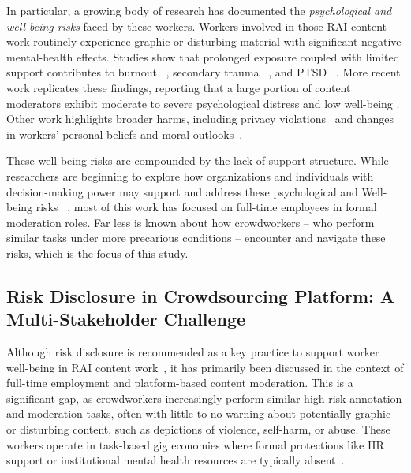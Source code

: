 In particular, a growing body of research has documented the \textit{psychological and well-being risks} faced by these workers. Workers involved in those RAI content work routinely experience graphic or disturbing material with significant negative mental-health effects.  Studies show that prolonged exposure coupled with limited support contributes to burnout ~\cite{dosono2019moderation}, secondary trauma ~\cite{MartinezSadurni2024CaseReport}, and PTSD ~\cite{steiger_psychological_2021, AlEmadi2024HateSpeech, Michel2018ExContentMS, ruckenstein_re-humanizing_2020, Dwoskin_2019, arsht_2018_human}. More recent work replicates these findings, reporting that a large portion of content moderators exhibit moderate to severe psychological distress and low well-being \cite{Spence2025ContentModeratorMentalHealth}. Other work highlights broader harms, including privacy violations~\cite{pinchevski2023social, schopke-gonzalez_why_2022} and changes in workers’ personal beliefs and moral outlooks~\cite{newton_trauma_2019, Stackpole_2022, Douek_2021}.

These well-being risks are compounded by the lack of support structure. While researchers are beginning to explore how organizations and individuals with decision-making power may support and address these psychological and Well-being risks ~\cite{qian2025aura, qian2025locating, steiger_psychological_2021, bharucha2023content}, most of this work has focused on full-time employees in formal moderation roles. Far less is known about how crowdworkers -- who perform similar tasks under more precarious conditions -- encounter and navigate these risks, which is the focus of this study.


\subsection{Risk Disclosure in Crowdsourcing Platform: A Multi-Stakeholder Challenge}
Although risk disclosure is recommended as a key practice to support worker well-being in RAI content work~\cite{bharucha2023content, qian2025aura}, it has primarily been discussed in the context of full-time employment and platform-based content moderation. This is a significant gap, as crowdworkers increasingly perform similar high-risk annotation and moderation tasks, often with little to no warning about potentially graphic or disturbing content, such as depictions of violence, self-harm, or abuse. These workers operate in task-based gig economies where formal protections like HR support or institutional mental health resources are typically absent~\cite{irani2013turkopticon, martin2014being, salehi2018ink, silberman2018responsible, toxtli2021quantifying, schlicher2021flexible}.

